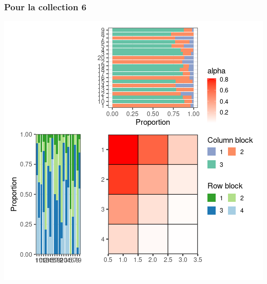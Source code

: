 \subsubsection{Pour la collection 6 }

\includegraphics{./img/9b8b977552f9856c8f2569fd0a1796c7df59125e.png}\newline \tiny

